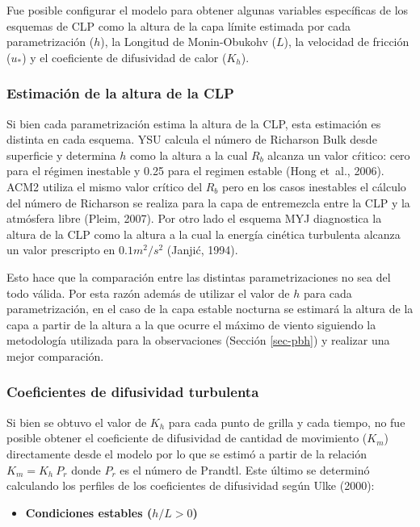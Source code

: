 \documentclass[12pt,spanish,oneside, a4paper]{book}
\providecommand{\tightlist}{%
  \setlength{\itemsep}{0pt}\setlength{\parskip}{0pt}}
\begin{document}
Fue posible configurar el modelo para obtener algunas variables
específicas de los esquemas de CLP como la altura de la capa límite
estimada por cada parametrización (\(h\)), la Longitud de Monin-Obukohv
(\(L\)), la velocidad de fricción (\(u_*\)) y el coeficiente de
difusividad de calor (\(K_h\)).

\subsubsection{Estimación de la altura de la
CLP}\label{estimacion-de-la-altura-de-la-clp}

Si bien cada parametrización estima la altura de la CLP, esta estimación
es distinta en cada esquema. YSU calcula el número de Richarson Bulk
desde superficie y determina \(h\) como la altura a la cual \(R_b\)
alcanza un valor cŕitico: cero para el régimen inestable y 0.25 para el
regimen estable (Hong et~al., 2006). ACM2 utiliza el mismo valor crítico
del \(R_b\) pero en los casos inestables el cálculo del número de
Richarson se realiza para la capa de entremezcla entre la CLP y la
atmósfera libre (Pleim, 2007). Por otro lado el esquema MYJ diagnostica
la altura de la CLP como la altura a la cual la energía cinética
turbulenta alcanza un valor prescripto en \(0.1 m^2/s^2\) (Janjić,
1994).

Esto hace que la comparación entre las distintas parametrizaciones no
sea del todo válida. Por esta razón además de utilizar el valor de \(h\)
para cada parametrización, en el caso de la capa estable nocturna se
estimará la altura de la capa a partir de la altura a la que ocurre el
máximo de viento siguiendo la metodología utilizada para la
observaciones (Sección \ref{sec-pbh}) y realizar una mejor comparación.

\subsubsection{Coeficientes de difusividad
turbulenta}\label{coeficientes-de-difusividad-turbulenta}

Si bien se obtuvo el valor de \(K_h\) para cada punto de grilla y cada
tiempo, no fue posible obtener el coeficiente de difusividad de cantidad
de movimiento (\(K_m\)) directamente desde el modelo por lo que se
estimó a partir de la relación \(K_m = K_h \: P_r\) donde \(P_r\) es el
número de Prandtl. Este último se determinó calculando los perfiles de
los coeficientes de difusividad según Ulke (2000):

\begin{itemize}
\tightlist
\item
  \textbf{Condiciones estables (\(h/L > 0\))}
\end{itemize}
\end{document}

